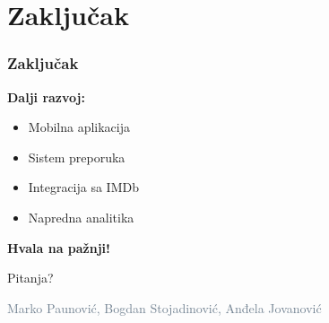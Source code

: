 \documentclass{beamer}
\begin{document}
\section{Zaključak}

\begin{frame}
\frametitle{Zaključak}
\textbf{Dalji razvoj:}
\begin{itemize}
\item Mobilna aplikacija
\item Sistem preporuka
\item Integracija sa IMDb
\item Napredna analitika
\end{itemize}
\end{frame}

\begin{frame}[plain]

\centering
\vspace{60pt}
{\Huge\bfseries\textcolor{darkcharcoal}{Hvala na pažnji!}}

\vspace{25pt}
{\Large\textcolor{accent}{Pitanja?}}

\vspace{40pt}
{\small\textcolor{slategray}{Marko Paunović, Bogdan Stojadinović, Anđela Jovanović}}
\end{frame}
\end{document}
